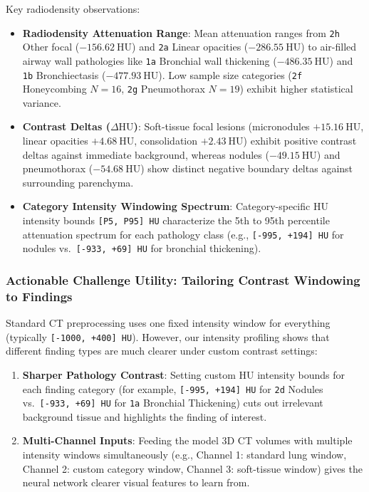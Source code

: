 \documentclass[11pt,a4paper]{article}
\begin{document}
Key radiodensity observations:
\begin{itemize}
    \item \textbf{Radiodensity Attenuation Range}: Mean attenuation ranges from \texttt{2h} Other focal ($-156.62~\text{HU}$) and \texttt{2a} Linear opacities ($-286.55~\text{HU}$) to air-filled airway wall pathologies like \texttt{1a} Bronchial wall thickening ($-486.35~\text{HU}$) and \texttt{1b} Bronchiectasis ($-477.93~\text{HU}$). Low sample size categories (\texttt{2f} Honeycombing $N=16$, \texttt{2g} Pneumothorax $N=19$) exhibit higher statistical variance.
    \item \textbf{Contrast Deltas ($\Delta \text{HU}$)}: Soft-tissue focal lesions (micronodules $+15.16~\text{HU}$, linear opacities $+4.68~\text{HU}$, consolidation $+2.43~\text{HU}$) exhibit positive contrast deltas against immediate background, whereas nodules ($-49.15~\text{HU}$) and pneumothorax ($-54.68~\text{HU}$) show distinct negative boundary deltas against surrounding parenchyma.
    \item \textbf{Category Intensity Windowing Spectrum}: Category-specific HU intensity bounds \texttt{[P5, P95] HU} characterize the 5th to 95th percentile attenuation spectrum for each pathology class (e.g., \texttt{[-995, +194] HU} for nodules vs.\ \texttt{[-933, +69] HU} for bronchial thickening).
\end{itemize}

\subsubsection*{Actionable Challenge Utility: Tailoring Contrast Windowing to Findings}
Standard CT preprocessing uses one fixed intensity window for everything (typically \texttt{[-1000, +400] HU}). However, our intensity profiling shows that different finding types are much clearer under custom contrast settings:
\begin{enumerate}
    \item \textbf{Sharper Pathology Contrast}: Setting custom HU intensity bounds for each finding category (for example, \texttt{[-995, +194] HU} for \texttt{2d} Nodules vs.\ \texttt{[-933, +69] HU} for \texttt{1a} Bronchial Thickening) cuts out irrelevant background tissue and highlights the finding of interest.
    \item \textbf{Multi-Channel Inputs}: Feeding the model 3D CT volumes with multiple intensity windows simultaneously (e.g., Channel 1: standard lung window, Channel 2: custom category window, Channel 3: soft-tissue window) gives the neural network clearer visual features to learn from.
\end{enumerate}
\end{document}
